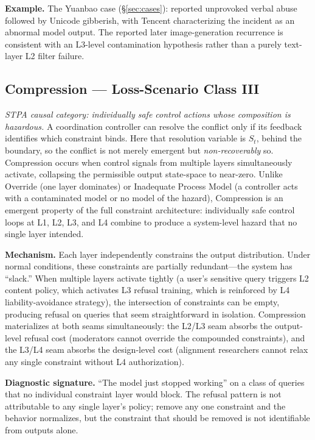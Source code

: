 \textbf{Example.} The Yuanbao case (\S\ref{sec:cases}): reported unprovoked verbal abuse followed by Unicode gibberish, with Tencent characterizing the incident as an abnormal model output. The reported later image-generation recurrence is consistent with an L3-level contamination hypothesis rather than a purely text-layer L2 filter failure.

\subsection{Compression --- Loss-Scenario Class III}

\emph{STPA causal category: individually safe control actions whose composition is hazardous.} A coordination controller can resolve the conflict only if its feedback identifies which constraint binds. Here that resolution variable is $S_t$, behind the boundary, so the conflict is not merely emergent but \emph{non-recoverably} so. Compression occurs when control signals from multiple layers simultaneously activate, collapsing the permissible output state-space to near-zero. Unlike Override (one layer dominates) or Inadequate Process Model (a controller acts with a contaminated model or no model of the hazard), Compression is an emergent property of the full constraint architecture: individually safe control loops at L1, L2, L3, and L4 combine to produce a system-level hazard that no single layer intended.

\textbf{Mechanism.} Each layer independently constrains the output distribution. Under normal conditions, these constraints are partially redundant---the system has ``slack.'' When multiple layers activate tightly (a user's sensitive query triggers L2 content policy, which activates L3 refusal training, which is reinforced by L4 liability-avoidance strategy), the intersection of constraints can be empty, producing refusal on queries that seem straightforward in isolation. Compression materializes at both seams simultaneously: the L2/L3 seam absorbs the output-level refusal cost (moderators cannot override the compounded constraints), and the L3/L4 seam absorbs the design-level cost (alignment researchers cannot relax any single constraint without L4 authorization).

\textbf{Diagnostic signature.} ``The model just stopped working'' on a class of queries that no individual constraint layer would block. The refusal pattern is not attributable to any single layer's policy; remove any one constraint and the behavior normalizes, but the constraint that should be removed is not identifiable from outputs alone.

